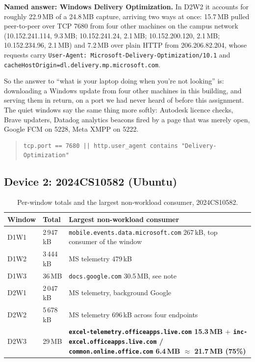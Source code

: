 \textbf{Named answer: Windows Delivery Optimization.} In D2W2 it accounts for roughly 22.9\,MB of
a 24.8\,MB capture, arriving two ways at once: 15.7\,MB pulled peer-to-peer over TCP 7680 from
four other machines on the campus network (10.152.241.114, 9.3\,MB; 10.152.241.24, 2.1\,MB;
10.152.200.120, 2.1\,MB; 10.152.234.96, 2.1\,MB) and 7.2\,MB over plain HTTP from
206.206.82.204, whose requests carry \texttt{User-Agent: Microsoft-Delivery-Optimization/10.1}
and \texttt{cacheHostOrigin=dl.delivery.mp.microsoft.com}.

So the answer to ``what is your laptop doing when you're not looking'' is: downloading a Windows
update from four other machines in this building, and serving them in return, on a port we had
never heard of before this assignment. The quiet windows say the same thing more softly:
Autodesk licence checks, Brave updaters, Datadog analytics beacons fired by a page that was
merely open, Google FCM on 5228, Meta XMPP on 5222.

\begin{quote}\ttfamily\footnotesize
\begin{verbatim}
tcp.port == 7680 || http.user_agent contains "Delivery-Optimization"
\end{verbatim}
\end{quote}

\subsection{Device 2: 2024CS10582 (Ubuntu)}

\begin{table}[H]
\centering
\caption{Per-window totals and the largest non-workload consumer, 2024CS10582.}
\label{tab:b1bg10582}
\footnotesize
\begin{tabular}{@{}ll>{\raggedright\arraybackslash}p{8.2cm}@{}}
\toprule
Window & Total & Largest non-workload consumer \\
\midrule
D1W1 & 2\,947\,kB & \texttt{mobile.events.data.microsoft.com} 267\,kB, top consumer of the window \\
D1W2 & 3\,444\,kB & MS telemetry 479\,kB \\
D1W3 & 36\,MB & \texttt{docs.google.com} 30.5\,MB, see note \\
D2W1 & 2\,047\,kB & MS telemetry, background Google \\
D2W2 & 5\,678\,kB & MS telemetry 696\,kB across four endpoints \\
D2W3 & 29\,MB & \textbf{\texttt{excel-telemetry.officeapps.live.com} 15.3\,MB $+$ \texttt{inc-excel.officeapps.live.com} / \texttt{common.online.office.com} 6.4\,MB $\approx$ 21.7\,MB (75\%)} \\
\bottomrule
\end{tabular}
\end{table}

